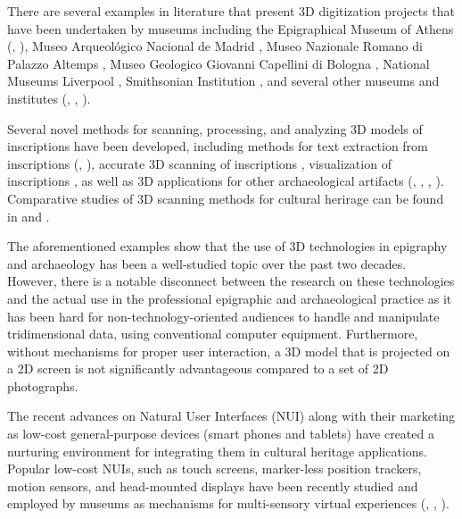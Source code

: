 \documentclass[amsthm,ebook]{saparticle}
\begin{document}
There are several examples in literature that present 3D digitization projects that have been undertaken by museums
including the Epigraphical Museum of Athens (\citet{sullivan_analytical_2011}, \citet{papadaki_accurate_2015}), Museo Arqueológico Nacional de
Madrid \citep{ramirez-sanchez_epigrafidigital:_2014}, Museo Nazionale Romano di Palazzo Altemps \citep{barmpoutis_interactive_2015}, Museo
Geologico Giovanni Capellini di Bologna \citep{abate_valorizzazione_2014}, National Museums Liverpool \citep{cooper_chiswick_2007},
Smithsonian Institution \citep{wachowiak_3d_2009}, and several other museums and institutes (\citet{barsanti_3d_2013}, \citet{landon_petroglyph_2006}, \citet{levoy_digital_2000}).

Several novel methods for scanning, processing, and analyzing 3D models of inscriptions have been developed, including
methods for text extraction from inscriptions (\citet{aswatha_method_2014}, \citet{sullivan_analytical_2011}), accurate 3D scanning of
inscriptions \citep{papadaki_accurate_2015}, visualization of inscriptions \citep{bozia_open-access_2014}, as well as 3D applications for
other archaeological artifacts (\citet{babeu__2011}, \citet{pollefeys_image-based_2001}, \citet{malzbender_polynomial_2001}, \citet{esteban_silhouette_2004}).
Comparative studies of 3D scanning methods for cultural herirage can be found in \citep{pavlidis_methods_2007} and \citep{bohler_3d_2004}. 

The aforementioned examples show that the use of 3D technologies in epigraphy and archaeology has been a
well-studied topic over the past two decades. However, there is a notable disconnect between the research on these
technologies and the actual use in the professional epigraphic and archaeological practice as it has been hard for
non-technology-oriented audiences to handle and manipulate tridimensional data, using conventional computer equipment.
Furthermore, without mechanisms for proper user interaction, a 3D model that is projected on a 2D screen is not
significantly advantageous compared to a set of 2D photographs. 

The recent advances on Natural User Interfaces (NUI) along with their marketing as low-cost general-purpose devices
(smart phones and tablets) have created a nurturing environment for integrating them in cultural heritage applications.
Popular low-cost NUIs, such as touch screens, marker-less position trackers, motion sensors, and head-mounted displays
have been recently studied and employed by museums as mechanisms for multi-sensory virtual experiences (\citet{ujitoko_application_2015}, \citet{soile_accurate_2013}, \citet{ikei_experience_2015}).
\end{document}
